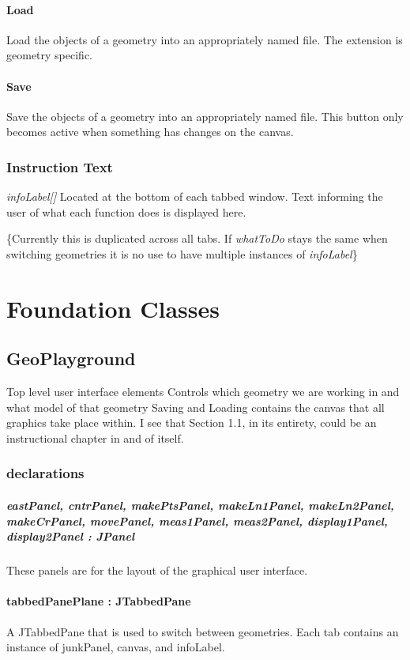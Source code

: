 \documentclass[a4paper,10pt]{report}
\begin{document}
\subsubsection{Load}
Load the objects of a geometry into an appropriately named file.  The extension is geometry specific.
\subsubsection{Save}
Save the objects of a geometry into an appropriately named file.  This button only becomes active when something has changes on the canvas.
\subsection{Instruction Text}
{\it infoLabel[]} Located at the bottom of each tabbed window. Text informing the user of what each function does is displayed here.

\{Currently this is duplicated across all tabs.  If {\it whatToDo} stays the same when switching geometries it is no use to have multiple instances of {\it infoLabel}\}

\chapter{Foundation Classes}
\section{GeoPlayground}
  Top level user interface elements
  Controls which geometry we are working in and what model of that geometry
  Saving and Loading
  contains the canvas that all graphics take place within.  I see that Section 1.1, in its entirety, could be an instructional chapter in and of itself.

\subsection{declarations}
\paragraph{eastPanel, cntrPanel, makePtsPanel, makeLn1Panel, makeLn2Panel, makeCrPanel, movePanel, meas1Panel, meas2Panel, display1Panel, display2Panel : JPanel} These panels are for the layout of the graphical user interface.
\subsubsection{tabbedPanePlane : JTabbedPane}A JTabbedPane that is used to switch between geometries. Each tab contains an instance of junkPanel, canvas, and infoLabel.
\end{document}
